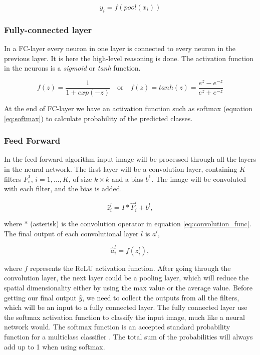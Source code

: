 \documentclass[thesis.tex]{subfiles}
\begin{document}
\begin{equation} %
  y_i = f(pool(x_i))
  \label{eq:pool_func}
\end{equation}


\subsubsection{Fully-connected layer}
In a FC-layer every neuron in one layer is connected to every neuron in the previous layer. It is here the high-level reasoning is done. The activation function in the neurons is a \textit{sigmoid} or \textit{tanh} function.

\begin{equation} %
  f(z) = \frac{1}{1+exp(-z)} \quad \text{or} \quad f(z) = tanh(z) = \frac{e^{z} - e^{-z}}{e^{z} + e^{-z}}
\end{equation}

At the end of FC-layer we have an activation function such as softmax (equation \ref{eq:softmax}) to calculate probability of the predicted classes.


\subsubsection{Feed Forward}
In the feed forward algorithm input image will be processed through all the layers in the neural network. The first layer will be a convolution layer, containing $K$ filters $F_i^1$, $i= 1, ..., K$, of size $k \times k$ and a bias $b^1$. The image will be convoluted with each filter, and the bias is added. 

\begin{equation}
    \hat{z}_i^l = I * \hat{F}_i^l + b^l, 
\end{equation}

where $*$ (asterisk) is the convolution operator in equation \ref{eq:convolution_func}. The final output of each convolutional layer $l$ is $a^l$,

\begin{equation}
    \hat{a}_i^l = f(z_i^l), 
\end{equation}

where $f$ represents the ReLU activation function. After going through the convolution layer, the next layer could be a pooling layer, which will reduce the spatial dimensionality either by using the max value or the average value.
Before getting our final output $\hat{y}$, we need to collect the outputs from all the filters, which will be an input to a fully connected layer. 
The fully connected layer use the softmax activation function to classify the input image, much like a neural network would. The softmax function is an accepted standard probability function for a multiclass classifier \cite{NotesBackpropagation16}. The total sum of the probabilities will always add up to 1 when using softmax. 
\end{document}
